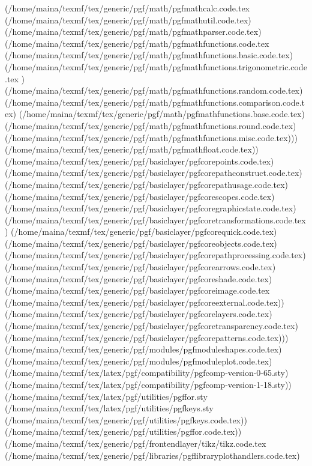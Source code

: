 \begin{center}
\begin{center}
{{(/home/maina/texmf/tex/generic/pgf/math/pgfmathcalc.code.tex
(/home/maina/texmf/tex/generic/pgf/math/pgfmathutil.code.tex)
(/home/maina/texmf/tex/generic/pgf/math/pgfmathparser.code.tex)
(/home/maina/texmf/tex/generic/pgf/math/pgfmathfunctions.code.tex
(/home/maina/texmf/tex/generic/pgf/math/pgfmathfunctions.basic.code.tex)
(/home/maina/texmf/tex/generic/pgf/math/pgfmathfunctions.trigonometric.code.tex
) (/home/maina/texmf/tex/generic/pgf/math/pgfmathfunctions.random.code.tex)
(/home/maina/texmf/tex/generic/pgf/math/pgfmathfunctions.comparison.code.tex)
(/home/maina/texmf/tex/generic/pgf/math/pgfmathfunctions.base.code.tex)
(/home/maina/texmf/tex/generic/pgf/math/pgfmathfunctions.round.code.tex)
(/home/maina/texmf/tex/generic/pgf/math/pgfmathfunctions.misc.code.tex)))
(/home/maina/texmf/tex/generic/pgf/math/pgfmathfloat.code.tex))
(/home/maina/texmf/tex/generic/pgf/basiclayer/pgfcorepoints.code.tex)
(/home/maina/texmf/tex/generic/pgf/basiclayer/pgfcorepathconstruct.code.tex)
(/home/maina/texmf/tex/generic/pgf/basiclayer/pgfcorepathusage.code.tex)
(/home/maina/texmf/tex/generic/pgf/basiclayer/pgfcorescopes.code.tex)
(/home/maina/texmf/tex/generic/pgf/basiclayer/pgfcoregraphicstate.code.tex)
(/home/maina/texmf/tex/generic/pgf/basiclayer/pgfcoretransformations.code.tex)
(/home/maina/texmf/tex/generic/pgf/basiclayer/pgfcorequick.code.tex)
(/home/maina/texmf/tex/generic/pgf/basiclayer/pgfcoreobjects.code.tex)
(/home/maina/texmf/tex/generic/pgf/basiclayer/pgfcorepathprocessing.code.tex)
(/home/maina/texmf/tex/generic/pgf/basiclayer/pgfcorearrows.code.tex)
(/home/maina/texmf/tex/generic/pgf/basiclayer/pgfcoreshade.code.tex)
(/home/maina/texmf/tex/generic/pgf/basiclayer/pgfcoreimage.code.tex
(/home/maina/texmf/tex/generic/pgf/basiclayer/pgfcoreexternal.code.tex))
(/home/maina/texmf/tex/generic/pgf/basiclayer/pgfcorelayers.code.tex)
(/home/maina/texmf/tex/generic/pgf/basiclayer/pgfcoretransparency.code.tex)
(/home/maina/texmf/tex/generic/pgf/basiclayer/pgfcorepatterns.code.tex)))
(/home/maina/texmf/tex/generic/pgf/modules/pgfmoduleshapes.code.tex)
(/home/maina/texmf/tex/generic/pgf/modules/pgfmoduleplot.code.tex)
(/home/maina/texmf/tex/latex/pgf/compatibility/pgfcomp-version-0-65.sty)
(/home/maina/texmf/tex/latex/pgf/compatibility/pgfcomp-version-1-18.sty))
(/home/maina/texmf/tex/latex/pgf/utilities/pgffor.sty
(/home/maina/texmf/tex/latex/pgf/utilities/pgfkeys.sty
(/home/maina/texmf/tex/generic/pgf/utilities/pgfkeys.code.tex))
(/home/maina/texmf/tex/generic/pgf/utilities/pgffor.code.tex))
(/home/maina/texmf/tex/generic/pgf/frontendlayer/tikz/tikz.code.tex
(/home/maina/texmf/tex/generic/pgf/libraries/pgflibraryplothandlers.code.tex)
}}
\end{center}
\end{center}
